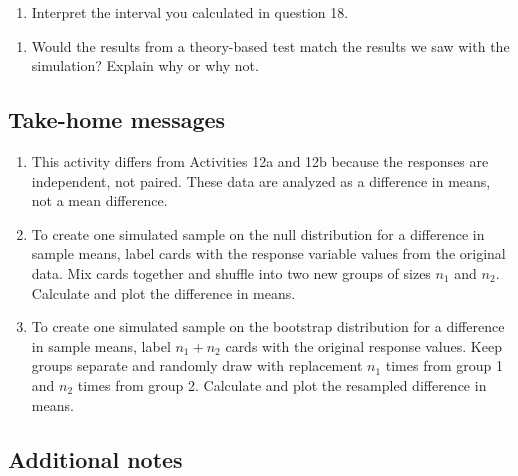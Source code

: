 \documentclass[
]{report}
\providecommand{\tightlist}{%
  \setlength{\itemsep}{0pt}\setlength{\parskip}{0pt}}
\begin{document}
\vspace{0.3in}

\begin{enumerate}
\def\labelenumi{\arabic{enumi}.}
\setcounter{enumi}{18}
\tightlist
\item
  Interpret the interval you calculated in question 18.
\end{enumerate}

\vspace{1in}

\begin{enumerate}
\def\labelenumi{\arabic{enumi}.}
\setcounter{enumi}{19}
\tightlist
\item
  Would the results from a theory-based test match the results we saw with the simulation? Explain why or why not.
\end{enumerate}

\vspace{1in}

\newpage

\hypertarget{take-home-messages-20}{%
\subsection{Take-home messages}\label{take-home-messages-20}}

\begin{enumerate}
\def\labelenumi{\arabic{enumi}.}
\item
  This activity differs from Activities 12a and 12b because the responses are independent, not paired. These data are analyzed as a difference in means, not a mean difference.
\item
  To create one simulated sample on the null distribution for a difference in sample means, label cards with the response variable values from the original data. Mix cards together and shuffle into two new groups of sizes \(n_1\) and \(n_2\). Calculate and plot the difference in means.
\item
  To create one simulated sample on the bootstrap distribution for a difference in sample means, label \(n_1 + n_2\) cards with the original response values. Keep groups separate and randomly draw with replacement \(n_1\) times from group 1 and \(n_2\) times from group 2. Calculate and plot the resampled difference in means.
\end{enumerate}

\hypertarget{additional-notes-20}{%
\subsection{Additional notes}\label{additional-notes-20}}
\end{document}
